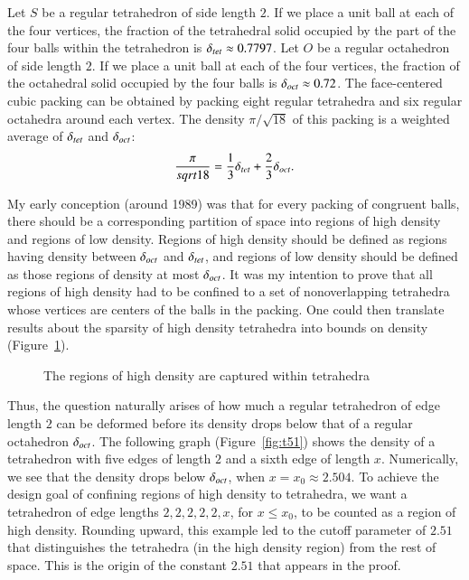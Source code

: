 Let $S$ be a regular tetrahedron of side length $2$.  If we place a
unit ball at each of the four vertices, the fraction of the
tetrahedral solid occupied by the part of the four balls within the
tetrahedron is $\delta_{tet}\approx 0.7797$. Let $O$ be a regular
octahedron of side length $2$.  If we place a unit ball at each of
the four vertices, the fraction of the octahedral solid occupied by
the four balls is $\delta_{oct}\approx 0.72$. The face-centered cubic
packing can be obtained by packing eight regular tetrahedra and six
regular octahedra around each vertex. The density $\pi/\sqrt{18}$ of
this packing is a weighted average of $\delta_{tet}$ and $\delta_{oct}$:
    $$\frac\pi{sqrt{18}} = \frac13\delta_{tet} + \frac23\delta_{oct}.$$

My early conception (around 1989) was that for every packing of
congruent balls, there should be a corresponding partition of space
into regions of high density and regions of low density. Regions of
high density should be defined as regions having density between
$\delta_{oct}$ and $\delta_{tet}$, and regions of low density should be defined as
those regions of density at most $\delta_{oct}$.  It was my intention to
prove that all regions of high density had to be confined to a set
of nonoverlapping tetrahedra whose vertices are centers of the balls
in the packing.  One could then translate results about the sparsity
of high density tetrahedra into bounds on density 
(Figure~\ref{fig:tetra-sparse}).

\begin{figure}[htb]
  \centering
  \caption{The regions of high density are captured within tetrahedra}
  \label{fig:tetra-sparse}
\end{figure}



Thus, the question naturally arises of how much a regular
tetrahedron of edge length $2$ can be deformed before its density
drops below that of a regular octahedron $\delta_{oct}$.  The following
graph (Figure~\ref{fig:t51}) shows the density of a tetrahedron with
five edges of length $2$ and a sixth edge of length $x$.
Numerically, we see that the density drops below $\delta_{oct}$, when
$x=x_0\approx 2.504$. To achieve the design goal of confining
regions of high density to tetrahedra, we want a tetrahedron of edge
lengths $2,2,2,2,2,x$, for $x\le x_0$, to be counted as a region of
high density. Rounding upward, this example led to the cutoff
parameter of $2.51$ that distinguishes the tetrahedra (in the high
density region) from the rest of space. This is the origin of the
constant $2.51$ that appears in the proof.


